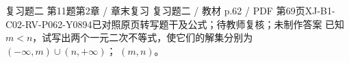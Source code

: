 \par\noindent\begin{minipage}{\linewidth}
\begin{bankitem}{复习题二 第11题}{第2章 / 章末复习 复习题二 / 教材 p.62 / PDF 第69页}{XJ-B1-C02-RV-P062-Y0894}{已对照原页转写题干及公式；待教师复核；未制作答案}
已知 $m<n$，试写出两个一元二次不等式，使它们的解集分别为
$(-\infty,m)\cup(n,+\infty)$；
$(m,n)$。
\end{bankitem}
\end{minipage}\par\medskip
